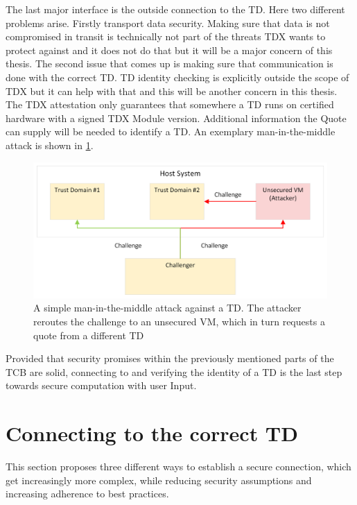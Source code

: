 The last major interface is the outside connection to the TD. Here two different problems arise. Firstly transport data security. Making sure that data is not compromised in transit is technically not part of the threats TDX wants to protect against and it does not do that but it will be a major concern of this thesis. The second issue that comes up is making sure that communication is done with the correct TD. TD identity checking is explicitly outside the scope of TDX but it can help with that and this will be another concern in this thesis. The TDX attestation only guarantees that somewhere a TD runs on certified hardware with a signed TDX Module version. Additional information the Quote can supply will be needed to identify a TD. An exemplary man-in-the-middle attack is shown in \ref{fig:man_in_the_middle}.
\begin{figure}
   \centering
       \includegraphics[width=.75\textwidth]{figures/Man-In-The-Middle.png} 
 \caption{A simple man-in-the-middle attack against a TD. The attacker reroutes the challenge to an unsecured VM, which in turn requests a quote from a different TD}
 \label{fig:man_in_the_middle}
\end{figure}
Provided that security promises within the previously mentioned parts of the TCB are solid, connecting to and verifying the identity of a \Gls{TD} is the last step towards secure computation with user Input.

\section{Connecting to the correct TD}

This section proposes three different ways to establish a secure connection, which get increasingly more complex, while reducing security assumptions and increasing adherence to best practices.


